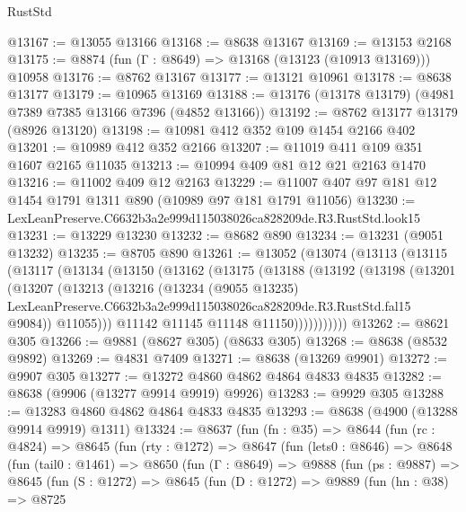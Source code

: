 \begin{lexlean}{RustStd}
\begin{coremodule}
@13167 := @13055 @13166
@13168 := @8638 @13167
@13169 := @13153 @2168
@13175 := @8874 (fun (Γ : @8649) => @13168 (@13123 (@10913 @13169))) @10958
@13176 := @8762 @13167
@13177 := @13121 @10961
@13178 := @8638 @13177
@13179 := @10965 @13169
@13188 := @13176 (@13178 @13179) (@4981 @7389 @7385 @13166 @7396 (@4852 @13166))
@13192 := @8762 @13177 @13179 (@8926 @13120)
@13198 := @10981 @412 @352 @109 @1454 @2166 @402
@13201 := @10989 @412 @352 @2166
@13207 := @11019 @411 @109 @351 @1607 @2165 @11035
@13213 := @10994 @409 @81 @12 @21 @2163 @1470
@13216 := @11002 @409 @12 @2163
@13229 := @11007 @407 @97 @181 @12 @1454 @1791 @1311 @890 (@10989 @97 @181 @1791 @11056)
@13230 := LexLeanPreserve.C6632b3a2e999d115038026ca828209de.R3.RustStd.look15
@13231 := @13229 @13230
@13232 := @8682 @890
@13234 := @13231 (@9051 @13232)
@13235 := @8705 @890
@13261 := @13052
    (@13074
      (@13113
        (@13115
          (@13117
            (@13134
              (@13150
                (@13162
                  (@13175
                    (@13188
                      (@13192
                        (@13198
                          (@13201
                            (@13207
                              (@13213
                                (@13216
                                  (@13234
                                    (@9055 @13235)
                                    LexLeanPreserve.C6632b3a2e999d115038026ca828209de.R3.RustStd.fal15
                                    @9084))
                                @11055)))
                          @11142
                          @11145
                          @11148
                          @11150)))))))))))
@13262 := @8621 @305
@13266 := @9881 (@8627 @305) (@8633 @305)
@13268 := @8638 (@8532 @9892)
@13269 := @4831 @7409
@13271 := @8638 (@13269 @9901)
@13272 := @9907 @305
@13277 := @13272 @4860 @4862 @4864 @4833 @4835
@13282 := @8638 (@9906 (@13277 @9914 @9919) @9926)
@13283 := @9929 @305
@13288 := @13283 @4860 @4862 @4864 @4833 @4835
@13293 := @8638 (@4900 (@13288 @9914 @9919) @1311)
@13324 := @8637
    (fun (fn : @35) =>
    @8644
      (fun (rc : @4824) =>
      @8645
        (fun (rty : @1272) =>
        @8647
          (fun (lets0 : @8646) =>
          @8648
            (fun (tail0 : @1461) =>
            @8650
              (fun (Γ : @8649) =>
              @9888
                (fun (ps : @9887) =>
                @8645
                  (fun (S : @1272) =>
                  @8645
                    (fun (D : @1272) =>
                    @9889
                      (fun (hn : @38) =>
                      @8725

\end{coremodule}
\end{lexlean}
